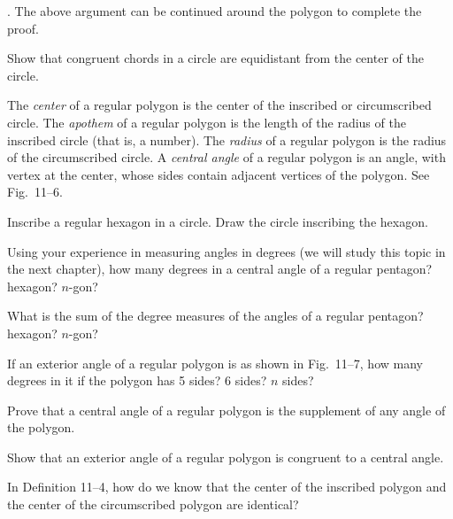 \documentclass[11pt]{book}
\theoremstyle{XIplainnote}
\theoremstyle{bkplain}
\begin{document}
. The above argument can be continued around the polygon to complete
the proof.

\FIGXIFIVESIX

Show that congruent chords in a circle are equidistant from the center of the
circle.

\begin{definition}
The \emph{center} of a regular polygon is the center of the inscribed or
circumscribed circle. The \emph{apothem} of a regular polygon is the length of
the radius of the inscribed circle (that is, a number). The \emph{radius} of a
regular polygon is the radius of the circumscribed circle. A \emph{central
angle} of a regular polygon is an angle, with vertex at the center, whose sides
contain adjacent vertices of the polygon. See Fig.~11--6.
\end{definition}

\begin{exercisecols}
\begin{exlist}
\item Inscribe a regular hexagon in a circle. Draw the circle inscribing the
      hexagon.
\item Using your experience in measuring angles in degrees (we will study this
      topic in the next chapter), how many degrees in a central angle of a
      regular pentagon? hexagon? $n$-gon?
\item What is the sum of the degree measures of the angles of a regular
      pentagon? hexagon? $n$-gon?
\item If an exterior angle of a regular polygon is as shown in Fig.~11--7, how
      many degrees in it if the polygon has 5 sides? 6 sides? $n$ sides?
\exfig{\FIGXISEVEN}
\item Prove that a central angle of a regular polygon is the supplement of any
      angle of the polygon.
\item Show that an exterior angle of a regular polygon is congruent to a
      central angle.
\item In Definition 11--4, how do we know that the center of the inscribed
      polygon and the center of the circumscribed polygon are identical?
\end{exlist}
\end{exercisecols}
\end{document}
